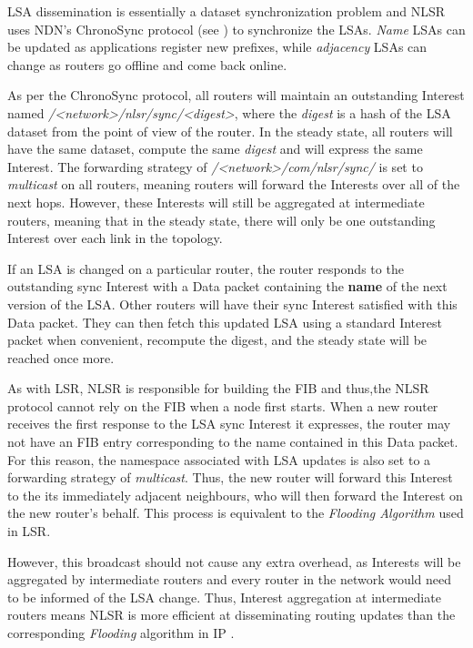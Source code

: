 LSA dissemination is essentially a dataset synchronization problem and NLSR uses NDN's ChronoSync protocol (see ) to synchronize the LSAs. \textit{Name} LSAs can be updated as applications register new prefixes, while \textit{adjacency} LSAs can change as routers go offline and come back online.

As per the ChronoSync protocol, all routers will maintain an outstanding Interest named \textit{/<network>/nlsr/sync/<digest>}, where the \textit{digest} is a hash of the LSA dataset from the point of view of the router. In the steady state, all routers will have the same dataset, compute the same \textit{digest} and will express the same Interest. The forwarding strategy of \textit{/<network>/com/nlsr/sync/} is set to \textit{multicast} on all routers, meaning routers will forward the Interests over all of the next hops. However, these Interests  will still be aggregated at intermediate routers, meaning that in the steady state, there will only be one outstanding Interest over each link in the topology.

If an LSA is changed on a particular router, the router responds to the outstanding sync Interest with a Data packet containing the \textbf{name} of the next version of the LSA. Other routers will have their sync Interest satisfied with this Data packet. They can then fetch this updated LSA using a standard Interest packet when convenient, recompute the digest, and the steady state will be reached once more.  

As with LSR, NLSR is responsible for building the FIB and thus,the NLSR protocol cannot rely on the FIB when a node first starts.
When a new router receives the first response to the LSA sync Interest it expresses, the router may not have an FIB entry corresponding to the name contained in this Data packet. For this reason, the namespace associated with LSA updates is also set to a forwarding strategy of \textit{multicast}. Thus, the new router will forward this Interest to the its immediately adjacent neighbours, who will then forward the Interest on the new router's behalf. This process is equivalent to the \textit{Flooding Algorithm} used in LSR. 

However, this broadcast should not cause any extra overhead, as Interests will be aggregated by intermediate routers and every router in the network would need to be informed of the LSA change. Thus, Interest aggregation at intermediate routers means NLSR is more efficient at disseminating routing updates than the corresponding \textit{Flooding} algorithm in IP \cite{nlsr}.


